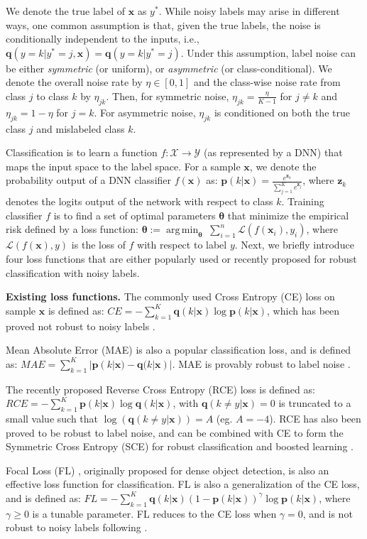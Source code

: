 \documentclass{article}
\def \xx {{\bm{x}}}
\def \pp {{\bm{p}}}
\def \qq {{\bm{q}}}
\def \zz {{\bm{z}}}
\def \btheta {{\bm{\theta}}}
\def \X  {\mathcal{X}}
\def \Y  {\mathcal{Y}}
\def \L  {\mathcal{L}}
\DeclareMathOperator*{\argmin}{arg\,min}
\begin{document}
We denote the true label of $\xx$ as $y^{*}$.
While noisy labels may arise in different ways, one common assumption is that, given the true labels, the noise is conditionally independent to the inputs, i.e., $\qq(y=k|y^{*}=j, \xx) = \qq(y=k|y^{*}=j)$.
Under this assumption, label noise can be either \emph{symmetric} (or uniform), or \emph{asymmetric} (or class-conditional). We denote the overall noise rate by $\eta \in[0, 1]$ and the class-wise noise rate from class $j$ to class $k$ by $\eta_{jk}$. Then, for symmetric noise, $\eta_{jk} = \frac{\eta}{K - 1}$ for $j \neq k$ and $\eta_{jk} = 1 - \eta$ for $j = k$.  For asymmetric noise, $\eta_{jk}$ is conditioned on both the true class $j$ and mislabeled class $k$. 

Classification is to learn a function $f: \X \rightarrow \Y$ (as represented by a DNN) that maps the input space to the label space.
For a sample $\xx$, we denote the probability output of a DNN classifier $f(\xx)$ as: $\pp(k|\xx) = \frac{e^{\zz_{k}}}{\sum_{j=1}^K e^{\zz_{j}}}$, where $\zz_k$ denotes the logits output of the network with respect to class $k$.
Training classifier $f$ is to find a set of optimal parameters $\btheta$ that minimize the empirical risk defined by a loss function: $\btheta := \argmin_{\btheta} \; \sum_{i=1}^{n} \L(f(\xx_i), y_i)$, where $\L(f(\xx), y)$ is the loss of $f$ with respect to label $y$.
Next, we briefly introduce four loss functions that are either popularly used or recently proposed for robust classification with noisy labels. 

\noindent\textbf{Existing loss functions.} 
The commonly used Cross Entropy (CE) loss on sample $\xx$ is defined as: $CE = -\sum_{k=1}^{K} \qq(k|\xx) \log \pp(k|\xx)$, which has been proved not robust to noisy labels \cite{ghosh2017robust}.

Mean Absolute Error (MAE) is also a popular classification loss, and is defined as: $MAE = \sum_{k=1}^{K} |\pp(k|\xx) - \qq(k|\xx)|$. 
MAE is provably robust to label noise \cite{ghosh2017robust}.

The recently proposed Reverse Cross Entropy (RCE) loss  \cite{wang2019symmetric} is defined as: $RCE = -\sum_{k=1}^{K} \pp(k|\xx) \log \qq(k|\xx)$,
with $\qq(k \neq y|\xx)=0$ is truncated to a small value such that $\log(\qq(k \neq y|\xx)) = A$ (eg. $A=-4$). RCE has also been proved to be robust to label noise, and can be combined with CE to form the Symmetric Cross Entropy (SCE) for robust classification and boosted learning \cite{wang2019symmetric}.

Focal Loss (FL) \cite{lin2017focal}, originally proposed for dense object detection, is also an effective loss function for classification. FL is also a generalization of the CE loss, and is defined as: $FL = -\sum_{k=1}^{K} \qq(k|\xx) (1 - \pp(k|\xx))^{\gamma}\log \pp(k|\xx)$,
where $\gamma \geq 0$ is a tunable parameter. FL reduces to the CE loss when $\gamma=0$, and is not robust to noisy labels following \cite{ghosh2017robust}.
\end{document}
